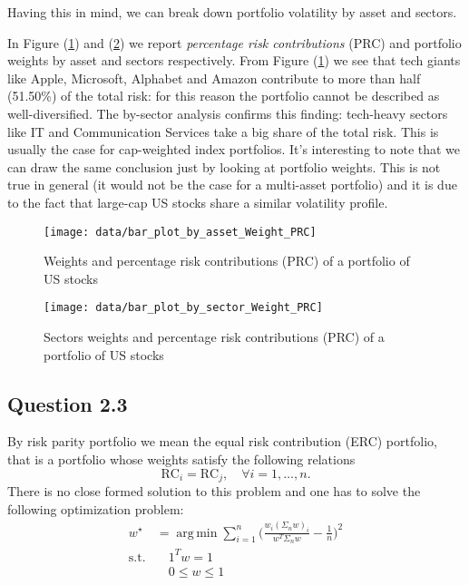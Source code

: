 \documentclass[12pt, a4paper]{article}
\DeclareMathOperator*{\argmin}{arg\,min}
\theoremstyle{problemstyle}
\begin{document}
Having this in mind, we can break down portfolio volatility by asset and sectors. 

In Figure (\ref{fig:histo_by_asset}) and (\ref{fig:histo_by_sector}) we report \textit{percentage risk contributions} (PRC) and portfolio weights by asset and sectors respectively. From Figure (\ref{fig:histo_by_asset}) we see that tech giants like Apple, Microsoft, Alphabet and Amazon contribute to more than half (51.50\%) of the total risk: for this reason the portfolio cannot be described as well-diversified. The by-sector analysis confirms this finding: tech-heavy sectors like IT and Communication Services take a big share of the total risk. This is usually the case for cap-weighted index portfolios. It's interesting to note that we can draw the same conclusion just by looking at portfolio weights. This is not true in general (it would not be the case for a multi-asset portfolio) and it is due to the fact that large-cap US stocks share a similar volatility profile.

\begin{figure}[H]
	\centering
	\texttt{[image: data/bar\_plot\_by\_asset\_Weight\_PRC]}
	\caption{Weights and percentage risk contributions (PRC) of a portfolio of US stocks}
	\label{fig:histo_by_asset}
\end{figure}
\begin{figure}[H]
 	\centering
 	\texttt{[image: data/bar\_plot\_by\_sector\_Weight\_PRC]}
 	\caption{Sectors weights and percentage risk contributions (PRC) of a portfolio of US stocks}
 	\label{fig:histo_by_sector}
 \end{figure}

\centering


\centering


\subsection{Question 2.3}
By risk parity portfolio we mean the equal risk contribution (ERC) portfolio, that is a portfolio whose weights satisfy the following relations
\begin{equation}
\text{RC}_i = \text{RC}_j, \quad \forall i=1, \ldots, n.
\end{equation}
There is no close formed solution to this problem and one has to solve the following optimization problem:
\begin{align}
w^{\star} & =  \argmin\sum_{i=1}^n\Bigg(\frac{w_i(\Sigma_n w)_i}{w^T \Sigma_n w} - \frac{1}{n}\Bigg)^2\\
\text{s.t.} & \quad 1^T w = 1 \\
& \quad 0 \leq w \leq 1
\end{align}
\end{document}
